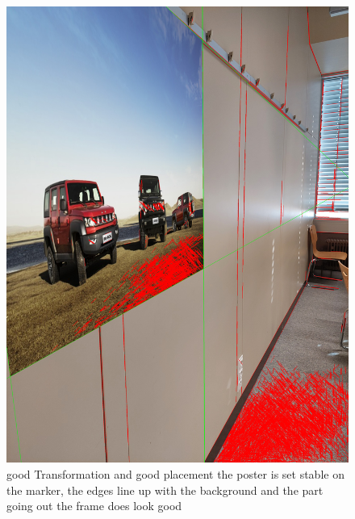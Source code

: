 \documentclass[a4paper,twocolumn]{article}
\begin{document}
    \begin{figure}[h!]
    \centering
    \includegraphics[width=0.9\columnwidth]{img/20221115_113440.jpg} %
    \caption{good Transformation and good placement the poster is set stable on the marker, the edges line up with the background and the part going out the frame does look good}
    \label{fig:20221115_113440.jpg}
    \end{figure}
    
\end{document}
